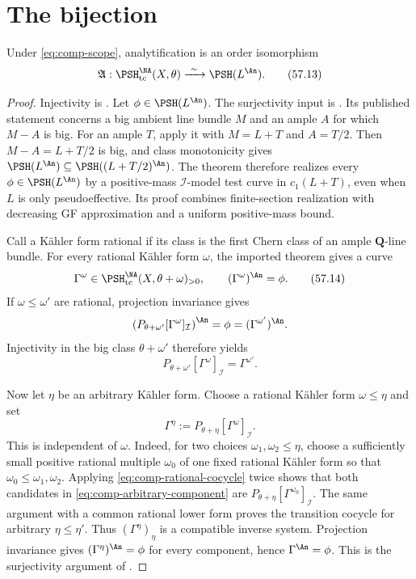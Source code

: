 \section{The bijection}
\label{sec:comp-bijection}

\begin{samepage}
\begin{theorem}\label{thm:comp-dxz}
Under \eqref{eq:comp-scope}, analytification is an order isomorphism
\[
 \mathfrak A:
 \PSH^{\NA}_{\mathrm{tc}}(X,\theta)
       \xrightarrow{\ \sim\ }\PSH(L^{\An}).
\tag{57.13}\label{eq:comp-bijection}
\]
\end{theorem}
\end{samepage}

\begin{proof}
Injectivity is .
Let $\phi\in\PSH(L^{\An})$.
The surjectivity input is \cite[Theorem~3.12(ii)]{DXZ23}.
Its published statement concerns a big ambient line bundle $M$
and an ample $A$ for which $M-A$ is big.
For an ample $T$, apply it with $M=L+T$ and $A=T/2$.
Then $M-A=L+T/2$ is big, and class monotonicity gives
$\PSH(L^{\An})\subseteq\PSH((L+T/2)^{\An})$.
The theorem therefore realizes every $\phi\in\PSH(L^{\An})$
by a positive-mass $\mathcal I$-model test curve in $c_1(L+T)$,
even when $L$ is only pseudoeffective.
Its proof combines finite-section realization with decreasing GF
approximation and a uniform positive-mass bound.

Call a K\"ahler form rational if its class is the first Chern class of an
ample $\mathbf Q$-line bundle.  For every rational K\"ahler form
$\omega$, the imported theorem gives a curve
\[
 \Gamma^\omega\in
 \PSH^{\NA}_{\mathrm{tc}}(X,\theta+\omega)_{>0},
 \qquad
                         (\Gamma^\omega)^{\An}=\phi.
\tag{57.14}\label{eq:comp-rational-component}
\]
If $\omega\leq\omega'$ are rational, projection invariance gives
\[
 \left(P_{\theta+\omega'}[\Gamma^\omega]_{\mathcal I}\right)^{\An}
 =\phi=(\Gamma^{\omega'})^{\An}.
\]
Injectivity in the big class $\theta+\omega'$ therefore yields
\[
 P_{\theta+\omega'}[\Gamma^\omega]_{\mathcal I}
 =\Gamma^{\omega'}.
\tag{57.15}\label{eq:comp-rational-cocycle}
\]

Now let $\eta$ be an arbitrary K\"ahler form.  Choose a rational
K\"ahler form $\omega\leq\eta$ and set
\[
 \Gamma^\eta
 :=P_{\theta+\eta}[\Gamma^\omega]_{\mathcal I}.
\tag{57.16}\label{eq:comp-arbitrary-component}
\]
This is independent of $\omega$.  Indeed, for two choices
$\omega_1,\omega_2\leq\eta$, choose a sufficiently small positive
rational multiple $\omega_0$ of one fixed rational K\"ahler form so that
$\omega_0\leq\omega_1,\omega_2$.  Applying
\eqref{eq:comp-rational-cocycle} twice shows that both candidates in
\eqref{eq:comp-arbitrary-component} are
$P_{\theta+\eta}[\Gamma^{\omega_0}]_{\mathcal I}$.
The same argument with a common rational lower form proves the transition
cocycle for arbitrary $\eta\leq\eta'$.
Thus $(\Gamma^\eta)_\eta$ is a compatible inverse system.  Projection
invariance gives $(\Gamma^\eta)^{\An}=\phi$ for every component, hence
$\Gamma^{\An}=\phi$.  This is the surjectivity argument of
\cite[Theorem~3.14]{DXZ23}.
\end{proof}

